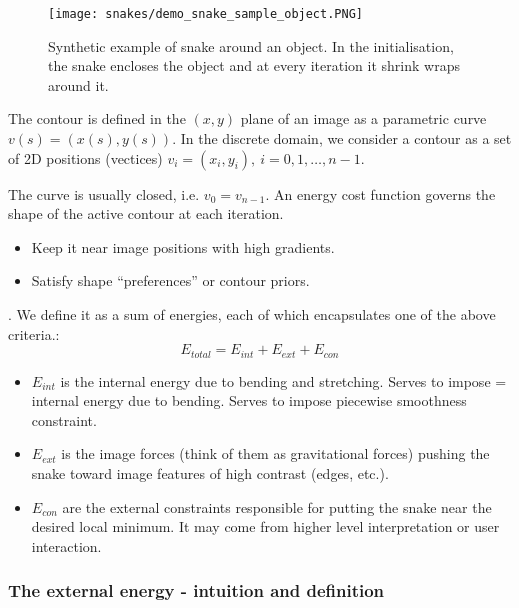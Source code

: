 \documentclass[a4paper]{article}
\begin{document}
\begin{figure}[H]
	\centering %
    	\texttt{[image: snakes/demo\_snake\_sample\_object.PNG]}
    \caption{Synthetic example of snake around an object. In the initialisation, the snake encloses the object and at every iteration it shrink wraps around it.}
\end{figure}


\begin{definition}
The contour is defined in the $(x,y)$ plane of an image as a
parametric curve $v(s) = \left(x(s), y(s)\right)$. In the discrete domain, we consider a contour as a set of 2D positions (vectices) $v_i = (x_i,y_i), \ i = 0,1,\ldots, n-1$.
\end{definition}
The curve is usually closed, i.e. $v_0 = v_{n-1}$.
An energy cost function governs the shape of the active contour at each iteration. \begin{itemize}
    \item Keep it near image positions with high gradients.
    \item Satisfy shape ``preferences'' or contour priors.
\end{itemize}. We define it as a sum of energies, each of which encapsulates one of the above criteria.:
\begin{equation}
    E_{total} = E_{int} +E_{ext} + E_{con} 
\end{equation}
\begin{itemize}
    \item $E_{int}$ is the internal energy due to bending and stretching. Serves to impose = internal energy due to bending. Serves to impose piecewise smoothness constraint.
    \item $E_{ext}$ is the image forces (think of them as gravitational forces) pushing the snake toward image  features  of high contrast (edges, etc.).
    \item $E_{con}$ are the external constraints responsible for putting the snake near the desired local minimum. It may come from higher level interpretation or user interaction.
\end{itemize}


\subsubsection{The external energy - intuition and definition}
\end{document}

